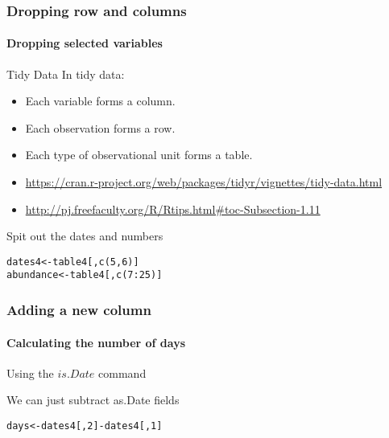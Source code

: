 \documentclass[12pt]{beamer}\usepackage[]{graphicx}\usepackage[]{color}
\makeatletter
\newcommand{\hlnum}[1]{\textcolor[rgb]{0.686,0.059,0.569}{#1}}%
\newcommand{\hlopt}[1]{\textcolor[rgb]{0,0,0}{#1}}%
\newcommand{\hlstd}[1]{\textcolor[rgb]{0.345,0.345,0.345}{#1}}%
\newcommand{\hlkwb}[1]{\textcolor[rgb]{0.69,0.353,0.396}{#1}}%
\newenvironment{kframe}{%
 \def\at@end@of@kframe{}%
 \ifinner\ifhmode%
  \def\at@end@of@kframe{\end{minipage}}%
  \begin{minipage}{\columnwidth}%
 \fi\fi%
 \def\FrameCommand##1{\hskip\@totalleftmargin \hskip-\fboxsep
 \colorbox{shadecolor}{##1}\hskip-\fboxsep
     \hskip-\linewidth \hskip-\@totalleftmargin \hskip\columnwidth}%
 \MakeFramed {\advance\hsize-\width
   \@totalleftmargin\z@ \linewidth\hsize
   \@setminipage}}%
 {\par\unskip\endMakeFramed%
 \at@end@of@kframe}
\newenvironment{knitrout}{}{} %
\makeatother
\begin{document}
\begin{frame}[fragile]
  \frametitle{Dropping row and columns}
  \framesubtitle{Dropping selected variables}

\begin{block}{Tidy Data}
In tidy data:
\begin{itemize}
\item Each variable forms a column.
\item Each observation forms a row.
\item Each type of observational unit forms a table.
\item \url{https://cran.r-project.org/web/packages/tidyr/vignettes/tidy-data.html}
\item \url{http://pj.freefaculty.org/R/Rtips.html#toc-Subsection-1.11}
\end{itemize}
\end{block}
 

\begin{block}{Spit out the dates and numbers}
\end{block}
\begin{lstlisting}
dates4<-table4[,c(5,6)]
abundance<-table4[,c(7:25)]
\end{lstlisting}
\end{frame}


\begin{frame}[fragile]
  \frametitle{Adding a new column}
  \framesubtitle{Calculating the number of days}
  Using the $is.Date$ command
  \begin{block}
  We can just subtract as.Date fields
  \end{block}
\begin{knitrout}
\color{fgcolor}\begin{kframe}
\begin{alltt}
 \hlstd{days}\hlkwb{<-}\hlstd{dates4[,}\hlnum{2}\hlstd{]}\hlopt{-}\hlstd{dates4[,}\hlnum{1}\hlstd{]}
\end{alltt}


{\ttfamily\noindent\bfseries\color{errorcolor}{\#\# Error in eval(expr, envir, enclos): object 'dates4' not found}}\end{kframe}
\end{knitrout}
  
\end{frame}
\end{document}
